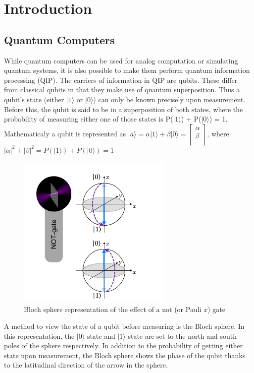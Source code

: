 \section{Introduction}
\label{sec:intro}


\subsection{Quantum Computers}
\label{sec:QC}
While quantum computers can be used for analog computation or simulating quantum systems\cite{henrietQuantumComputingNeutral2020}, 
it is also possible to make them perform quantum information processing (QIP). The carriers of information in QIP are qubits. These differ from classical qubits
in that they make use of quantum superposition. Thus a qubit's state (either $|1 \rangle$ or $|0 \rangle$) can only be known precisely upon measurement. Before this,
the qubit is said to be in a superposition of both states, where the probability of measuring either one of those states is P($|1 \rangle$) + P($|0 \rangle$) = 1\cite{wongIntroductionClassicalQuantum2022a}.
Mathematicaly a qubit is represented as $ |a \rangle = \alpha|1 \rangle + \beta|0 \rangle =  \begin{bmatrix}
    \alpha \\
    \beta \\
\end{bmatrix}$, where $|\alpha|^2 + |\beta|^2 = P(|1 \rangle) + P(|0 \rangle) = 1$

\begin{figure}
  \centering
  \includegraphics[width=75mm]{./Images/BlochNotGate.png}
  \caption{Bloch sphere representation of the effect of a not (or Pauli $x$) gate \cite{henrietQuantumComputingNeutral2020}} 
  \label{fig:BlockNotGate}

\end{figure}
A method to view the state of a qubit before measuring is the Bloch sphere. 
In this representation, the  $|0 \rangle$ state and $|1 \rangle$ state are set to the north and south poles of the sphere respectively\cite{wisemanInterpretationQuantumJump1993}. In addition to the 
probability of getting either state upon measurement, the Bloch sphere shows the phase of the qubit thanks to the latitudinal direction of the arrow in the sphere\cite{mckayEfficientGatesQuantum2017}.


